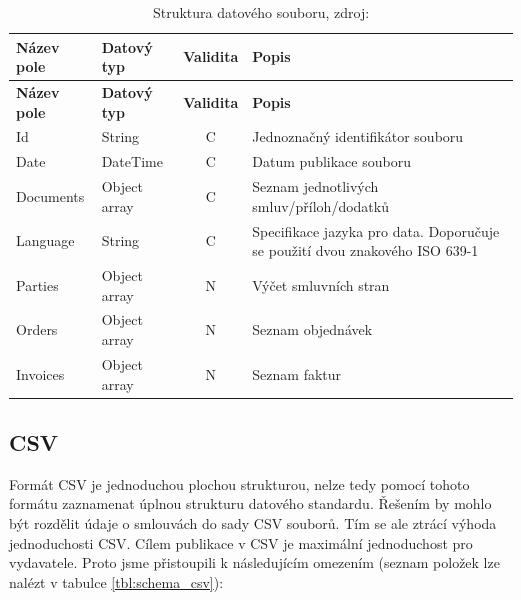 \newpage

\begin{center}
\begin{longtable}{lp{20mm}cp{65mm}}
\label{tbl:strukturaJson} \\
\multicolumn{1}{l}{\textbf{Název pole}} & 
\multicolumn{1}{l}{\textbf{Datový typ}} & 
\multicolumn{1}{l}{\textbf{Validita}} & 
\multicolumn{1}{l}{\textbf{Popis}} \\ \hline 
\endfirsthead
\multicolumn{1}{l}{\textbf{Název pole}} & 
\multicolumn{1}{l}{\textbf{Datový typ}} & 
\multicolumn{1}{l}{\textbf{Validita}} & 
\multicolumn{1}{l}{\textbf{Popis}} \\ \hline 
\hline
\endhead
\endfoot
\caption[Číselník datového souboru]{Struktura datového souboru, zdroj:\cite{metodika, standard}}
\endlastfoot
\rowcolor{validateC}Id & String & C & Jednoznačný identifikátor souboru \\
\rowcolor{validateC}Date & DateTime & C & Datum publikace souboru \\
\rowcolor{validateC}Documents & Object array & C & Seznam jednotlivých smluv/příloh/dodatků \\
\rowcolor{validateC}Language & String & C & Specifikace jazyka pro data. Doporučuje se použití dvou znakového ISO 639-1 \\
Parties & Object array & N & Výčet smluvních stran \\
Orders & Object array & N & Seznam objednávek \\
Invoices & Object array & N & Seznam faktur \\
\end{longtable}
\end{center}



\newpage

\subsection{CSV}

Formát CSV je jednoduchou plochou strukturou, nelze tedy pomocí tohoto formátu zaznamenat úplnou strukturu datového standardu. Řešením by mohlo být rozdělit údaje o smlouvách do sady CSV souborů. Tím se ale ztrácí výhoda jednoduchosti CSV. Cílem publikace v CSV je maximální jednoduchost pro vydavatele. Proto jsme přistoupili k následujícím omezením (seznam položek lze nalézt v tabulce \ref{tbl:schema_csv}):

